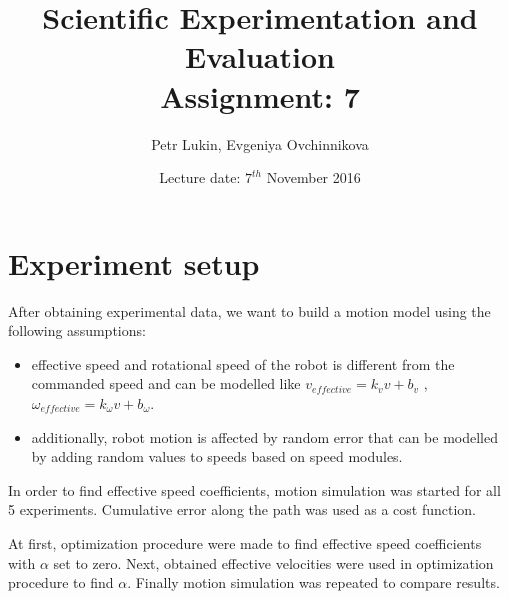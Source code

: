 \documentclass[a4paper, 12pt]{article}
\title{Scientific Experimentation and Evaluation  \\
				Assignment: 7}
\author{Petr Lukin, Evgeniya Ovchinnikova}
\date{Lecture date: $7^{th}$ November 2016}
\begin{document}



\maketitle

\section{Experiment setup}

After obtaining experimental data, we want to build a motion model using the following assumptions:
\begin{itemize}
\item effective speed and rotational speed of the robot is different from the commanded speed and can be modelled like $v_{effective} =k_v v+b_v $ , $\omega_{effective} =k_{\omega} v+b_{\omega} $.
\item additionally, robot motion is affected by random error that can be modelled by adding random values to speeds based on speed modules. 
\end{itemize}

In order to find effective speed coefficients, motion simulation was started for all 5 experiments. Cumulative error along the path was used as a cost function.



At first, optimization procedure were made to find effective speed coefficients with $\alpha$ set to zero. Next, obtained effective velocities were used in optimization procedure to find $\alpha$. Finally motion simulation was repeated to compare results.
\end{document}
